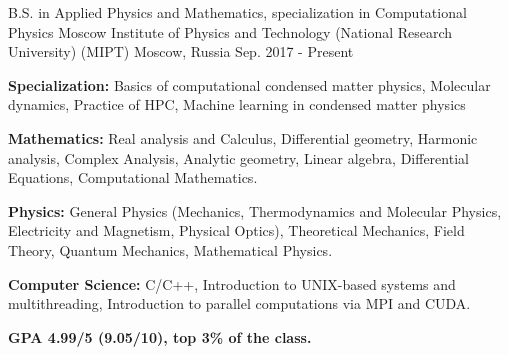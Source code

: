 

\begin{cventries}

  \cventry
    {B.S. in Applied Physics and Mathematics, specialization in Computational Physics} %
    {Moscow Institute of Physics and Technology (National Research University) (MIPT)} %
    {Moscow, Russia} %
    {Sep. 2017 - Present} %
    {
      \begin{cvitems} %
        \item {\textbf{Specialization:} Basics of computational condensed matter physics, Molecular dynamics, Practice of HPC, Machine learning in condensed matter physics}
        \item {\textbf{Mathematics:} Real analysis and Calculus, Differential geometry, Harmonic analysis, Complex Analysis, Analytic geometry, Linear algebra, Differential Equations, Computational Mathematics.}
        \item {\textbf{Physics:} General Physics (Mechanics, Thermodynamics and Molecular Physics, Electricity and Magnetism, Physical Optics), Theoretical Mechanics, Field Theory, Quantum Mechanics, Mathematical Physics.}
        \item {\textbf{Computer Science:}  C/C++, Introduction to UNIX-based systems and multithreading, Introduction to parallel computations via MPI and CUDA.
		\item {\textbf{GPA 4.99/5 (9.05/10), top 3\% of the class.}}        
}
      \end{cvitems}
    }

\end{cventries}

